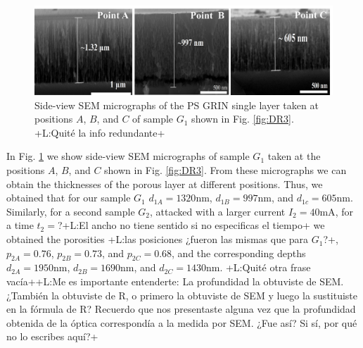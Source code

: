 \documentclass{article}
\newcommand{\notaL}[1]{{\color{blue}+L:#1+}}
\begin{document}
\begin{figure}
  \centering
  \includegraphics[width=\textwidth]{Images/semD11}
  \caption{Side-view SEM micrographs of the PS GRIN single layer
    taken at positions $A$, $B$, and $C$ of sample $G_1$ shown in
    Fig. \ref{fig:DR3}.
    \notaL{Quité la info redundante}}
  \label{fig:DR4}
\end{figure}

In Fig. \ref{fig:DR4} we show side-view SEM micrographs of sample
$G_1$ taken at the
positions $A$, $B$, and $C$ shown in
Fig. \ref{fig:DR3}. From these micrographs we can
obtain the thicknesses of the porous layer at different
positions. Thus, we obtained that for our sample $G_1$
$d_{1A}= 1320\text{nm}$, $ d_{1B} = 997\text{nm}$, and $d_{1c} = 605
\text{nm}$. Similarly, for a second sample $G_2$, attacked with a
larger current $I_2 =40 \text{mA}$, for a time $t_2=$?\notaL{El ancho no
  tiene sentido si no especificas el tiempo} we obtained the
porosities \notaL{las posiciones ¿fueron las mismas que para $G_1$?}, $p_{2A}= 0.76$, $p_{2B}=
0.73$, and $p_{2C}= 0.68$, and the corresponding depths $d_{2A}=1950\text{nm}$,
$d_{2B}=1690\text{nm}$, and $d_{2C}= 1430\text{nm}$. \notaL{Quité otra
  frase vacía}\notaL{Me es importante entenderte: La profundidad la
  obtuviste de SEM. ¿También la obtuviste de R, o primero la obtuviste
  de SEM y luego la sustituiste en la fórmula de R? Recuerdo que nos
  presentaste alguna vez que la profundidad obtenida de la óptica
  correspondía a la medida por SEM. ¿Fue así? Si sí, por qué no lo
  escribes aquí?}
\end{document}
